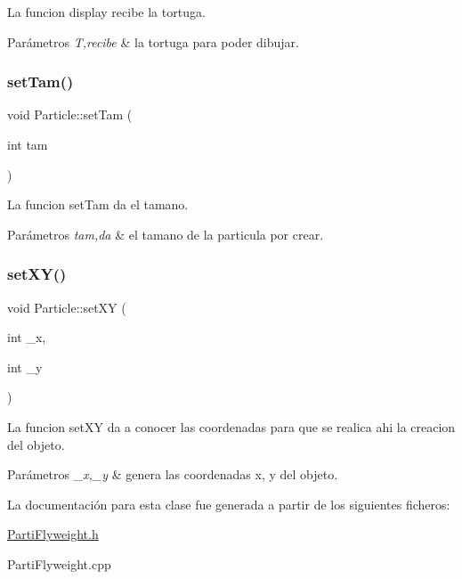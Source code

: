 La funcion display recibe la tortuga. 
\begin{DoxyParams}{Parámetros}
{\em T,recibe} & la tortuga para poder dibujar. \\
\hline
\end{DoxyParams}
\mbox{\label{classParticle_abd939556d3a09985d90db3dd13809c5c}} 
\subsubsection{\texorpdfstring{set\+Tam()}{setTam()}}
{\footnotesize\ttfamily void Particle\+::set\+Tam (\begin{DoxyParamCaption}\item[{int}]{tam }\end{DoxyParamCaption})\hspace{0.3cm}{\ttfamily [inline]}}

La funcion set\+Tam da el tamano. 
\begin{DoxyParams}{Parámetros}
{\em tam,da} & el tamano de la particula por crear. \\
\hline
\end{DoxyParams}
\mbox{\label{classParticle_a8a6aaeb2562d8540f42e5f63215bd207}} 
\subsubsection{\texorpdfstring{set\+X\+Y()}{setXY()}}
{\footnotesize\ttfamily void Particle\+::set\+XY (\begin{DoxyParamCaption}\item[{int}]{\+\_\+x,  }\item[{int}]{\+\_\+y }\end{DoxyParamCaption})}

La funcion set\+XY da a conocer las coordenadas para que se realica ahi la creacion del objeto. 
\begin{DoxyParams}{Parámetros}
{\em \+\_\+x,\+\_\+y} & genera las coordenadas x, y del objeto. \\
\hline
\end{DoxyParams}


La documentación para esta clase fue generada a partir de los siguientes ficheros\+:\begin{DoxyCompactItemize}
\item 
\hyperlink{PartiFlyweight_8h}{Parti\+Flyweight.\+h}\item 
Parti\+Flyweight.\+cpp\end{DoxyCompactItemize}
